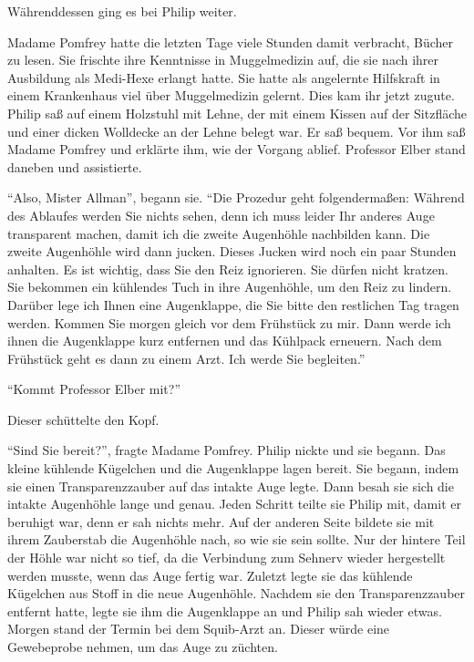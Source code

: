 Währenddessen ging es bei Philip weiter.

Madame Pomfrey hatte die letzten Tage viele Stunden damit verbracht, Bücher zu lesen. Sie frischte ihre Kenntnisse in Muggelmedizin auf, die sie nach ihrer Ausbildung als Medi-Hexe erlangt hatte. Sie hatte als angelernte Hilfskraft in einem Krankenhaus viel über Muggelmedizin gelernt. Dies kam ihr jetzt zugute. Philip saß auf einem Holzstuhl mit Lehne, der mit einem Kissen auf der Sitzfläche und einer dicken Wolldecke an der Lehne belegt war. Er saß bequem. Vor ihm saß Madame Pomfrey und erklärte ihm, wie der Vorgang ablief. Professor Elber stand daneben und assistierte.

\enquote{Also, Mister Allman}, begann sie. \enquote{Die Prozedur geht folgendermaßen: Während des Ablaufes werden Sie nichts sehen, denn ich muss leider Ihr anderes Auge transparent machen, damit ich die zweite Augenhöhle nachbilden kann. Die zweite Augenhöhle wird dann jucken. Dieses Jucken wird noch ein paar Stunden anhalten. Es ist wichtig, dass Sie den Reiz ignorieren. Sie dürfen nicht kratzen. Sie bekommen ein kühlendes Tuch in ihre Augenhöhle, um den Reiz zu lindern. Darüber lege ich Ihnen eine Augenklappe, die Sie bitte den restlichen Tag tragen werden. Kommen Sie morgen gleich vor dem Frühstück zu mir. Dann werde ich ihnen die Augenklappe kurz entfernen und das Kühlpack erneuern. Nach dem Frühstück geht es dann zu einem Arzt. Ich werde Sie begleiten.}

\enquote{Kommt Professor Elber mit?}

Dieser schüttelte den Kopf.

\enquote{Sind Sie bereit?}, fragte Madame Pomfrey. Philip nickte und sie begann.  Das kleine kühlende Kügelchen und die Augenklappe lagen bereit. Sie begann, indem sie einen Transparenzzauber auf das intakte Auge legte. Dann besah sie sich die intakte Augenhöhle lange und genau. Jeden Schritt teilte sie Philip mit, damit er beruhigt war, denn er sah nichts mehr. Auf der anderen Seite bildete sie mit ihrem Zauberstab die Augenhöhle nach, so wie sie sein sollte. Nur der hintere Teil der Höhle war nicht so tief, da die Verbindung zum Sehnerv wieder hergestellt werden musste, wenn das Auge fertig war. Zuletzt legte sie das kühlende Kügelchen aus Stoff in die neue Augenhöhle. Nachdem sie den Transparenzzauber entfernt hatte, legte sie ihm die Augenklappe an und Philip sah wieder etwas. Morgen stand der Termin bei dem Squib-Arzt an. Dieser würde eine Gewebeprobe nehmen, um das Auge zu züchten.

